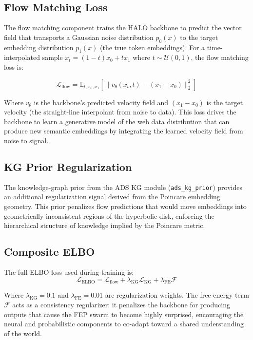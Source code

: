 \subsection{Flow Matching Loss}

The flow matching component trains the HALO backbone to predict the vector field that transports a Gaussian noise distribution $p_0(x)$ to the target embedding distribution $p_1(x)$ (the true token embeddings). For a time-interpolated sample $x_t = (1-t) x_0 + t x_1$ where $t \sim \mathcal{U}(0, 1)$, the flow matching loss is:

\begin{equation}
\mathcal{L}_{\text{flow}} = \mathbb{E}_{t, x_0, x_1}\left[\| v_\theta(x_t, t) - (x_1 - x_0) \|_2^2\right]
\end{equation}

Where $v_\theta$ is the backbone's predicted velocity field and $(x_1 - x_0)$ is the target velocity (the straight-line interpolant from noise to data). This loss drives the backbone to learn a generative model of the web data distribution that can produce new semantic embeddings by integrating the learned velocity field from noise to signal.

\subsection{KG Prior Regularization}

The knowledge-graph prior from the ADS KG module (\texttt{ads\_kg\_prior}) provides an additional regularization signal derived from the Poincare embedding geometry. This prior penalizes flow predictions that would move embeddings into geometrically inconsistent regions of the hyperbolic disk, enforcing the hierarchical structure of knowledge implied by the Poincare metric.

\subsection{Composite ELBO}

The full ELBO loss used during training is:
\begin{equation}
\mathcal{L}_{\text{ELBO}} = \mathcal{L}_{\text{flow}} + \lambda_{\text{KG}} \mathcal{L}_{\text{KG}} + \lambda_{\text{FE}} \mathcal{F}
\end{equation}

Where $\lambda_{\text{KG}} = 0.1$ and $\lambda_{\text{FE}} = 0.01$ are regularization weights. The free energy term $\mathcal{F}$ acts as a consistency regularizer: it penalizes the backbone for producing outputs that cause the FEP swarm to become highly surprised, encouraging the neural and probabilistic components to co-adapt toward a shared understanding of the world.
